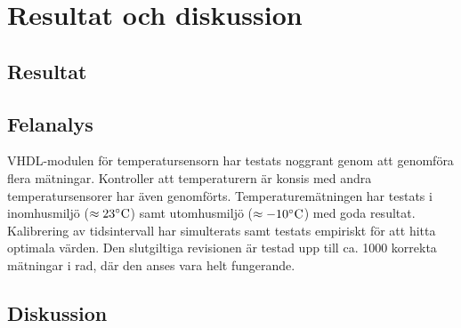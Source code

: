 \section{Resultat och diskussion}

\subsection{Resultat}

\subsection{Felanalys}
VHDL-modulen för temperatursensorn har testats noggrant genom att genomföra flera mätningar.
Kontroller att temperaturern är konsis med andra temperatursensorer har även genomförts. Temperaturemätningen har testats i inomhusmiljö ($\approx 23^\circ\mathrm{C}$) samt utomhusmiljö ($\approx -10^\circ\mathrm{C}$) med goda resultat.
Kalibrering av tidsintervall har simulterats samt testats empiriskt för att hitta optimala värden. Den slutgiltiga revisionen är testad upp till ca. 1000 korrekta mätningar i rad, där den anses vara helt fungerande.

\subsection{Diskussion}